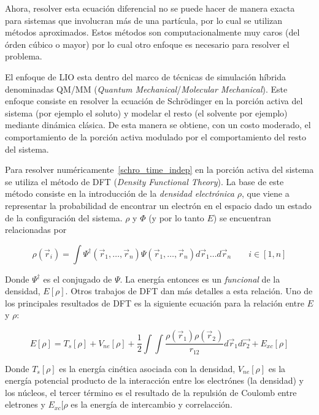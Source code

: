 Ahora, resolver esta ecuaci\'on diferencial no se puede hacer de manera exacta para sistemas que involucran m\'as
de una part\'icula, por lo cual se utilizan m\'etodos aproximados. Estos m\'etodos son computacionalmente muy caros
(del \'orden c\'ubico o mayor) por lo cual otro enfoque es necesario para resolver el problema.

El enfoque de LIO esta dentro del marco de t\'ecnicas de simulaci\'on h\'ibrida denominadas QM/MM 
(\textit{Quantum Mechanical}/\textit{Molecular Mechanical}). Este enfoque consiste en resolver la ecuaci\'on de
Schr\"odinger en la porci\'on activa del sistema (por ejemplo el soluto) y modelar el resto (el solvente por
ejemplo) mediante din\'amica cl\'asica. De esta manera se obtiene, con un costo moderado, el comportamiento de
la porci\'on activa modulado por el comportamiento del resto del sistema.

Para resolver num\'ericamente~\ref{schro_time_indep} en la porci\'on activa del sistema se utiliza el m\'etodo
de DFT (\textit{Density Functional Theory}). La base de este m\'etodo consiste en la introducci\'on de la
\textit{densidad electr\'onica} $\rho$, que viene a representar la probabilidad de encontrar un electr\'on en
el espacio dado un estado de la configuraci\'on del sistema. $\rho$ y $\Phi$ (y por lo tanto $E$) se encuentran relacionadas por

\begin{equation}
    \label{honenberg_kohn}
    \rho(\vec{r}_i) = \int \Psi^{\dagger}(\vec{r}_1, \dots, \vec{r}_n) \Psi(\vec{r}_1, \dots, \vec{r}_n) d\vec{r}_1 \dots d\vec{r}_n \qquad i \in [1,n]
\end{equation}

Donde $\Psi^{\dagger}$ es el conjugado de $\Psi$. La energ\'ia entonces es un \textit{funcional} de la densidad, $E[\rho]$. Otros trabajos de DFT dan m\'as
detalles a esta relaci\'on. Uno de los principales resultados de DFT es la siguiente ecuaci\'on para la relaci\'on entre $E$ y $\rho$:

\begin{equation}
    \label{honenberg_kohn} 
    E[\rho] = T_s[\rho] + V_{ne}[\rho] + \frac{1}{2} \int \int \frac{\rho(\vec{r}_1) \rho(\vec{r}_2)}{r_{12}} d\vec{r}_1 d\vec{r_2} + E_{xc}[\rho]
\end{equation}

Donde $T_s[\rho]$ es la energ\'ia cin\'etica asociada con la densidad, $V_{ne}[\rho]$ es la energ\'ia potencial producto de la interacci\'on entre los
electr\'ones (la densidad) y los n\'ucleos, el tercer t\'ermino es el resultado de la repulsi\'on de Coulomb entre eletrones y $E_{xc}[\rho$ es la
energ\'ia de intercambio y correlacci\'on.

